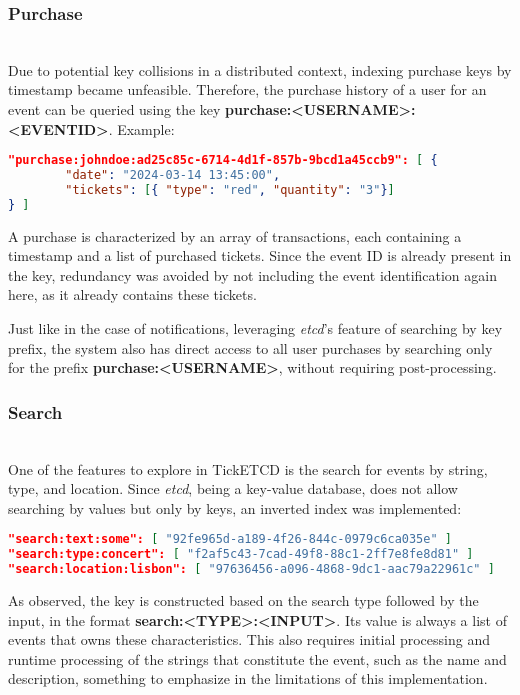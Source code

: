 \documentclass[screen,review]{acmart}
\begin{document}
\subsubsection{Purchase}~\\
Due to potential key collisions in a distributed context, indexing purchase keys by timestamp became unfeasible. Therefore, the purchase history of a user for an event can be queried using the key \textbf{purchase:<USERNAME>:<EVENTID>}. Example:

\begin{lstlisting}[language=json]
"purchase:johndoe:ad25c85c-6714-4d1f-857b-9bcd1a45ccb9": [ {
        "date": "2024-03-14 13:45:00",
        "tickets": [{ "type": "red", "quantity": "3"}]
} ]
\end{lstlisting}

A purchase is characterized by an array of transactions, each containing a timestamp and a list of purchased tickets. Since the event ID is already present in the key, redundancy was avoided by not including the event identification again here, as it already contains these tickets.

Just like in the case of notifications, leveraging \textit{etcd}'s feature of searching by key prefix, the system also has direct access to all user purchases by searching only for the prefix \textbf{purchase:<USERNAME>}, without requiring post-processing.\\

\subsubsection{Search}~\\
One of the features to explore in TickETCD is the search for events by string, type, and location. Since \textit{etcd}, being a key-value database, does not allow searching by values but only by keys, an inverted index was implemented:

\begin{lstlisting}[language=json]
"search:text:some": [ "92fe965d-a189-4f26-844c-0979c6ca035e" ]
"search:type:concert": [ "f2af5c43-7cad-49f8-88c1-2ff7e8fe8d81" ]
"search:location:lisbon": [ "97636456-a096-4868-9dc1-aac79a22961c" ]
\end{lstlisting}

As observed, the key is constructed based on the search type followed by the input, in the format \textbf{search:<TYPE>:<INPUT>}. Its value is always a list of events that owns these characteristics. This also requires initial processing and runtime processing of the strings that constitute the event, such as the name and description, something to emphasize in the limitations of this implementation.
\end{document}

